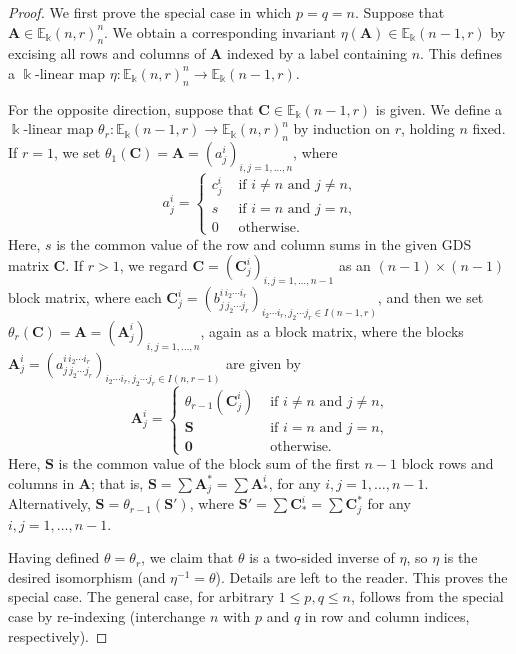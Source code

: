 \documentclass[ALCO,ThmDefs,Unicode,epreuves]{cedram}
\newcommand{\E}{\mathbb{E}}
\newcommand{\bA}{\mathbf{A}}
\newcommand{\bC}{\mathbf{C}}
\newcommand{\bzero}{\mathbf{0}}
\begin{document}
\begin{proof}
We first prove the special case in which $p=q=n$. Suppose that $\bA
\in \E_\Bbbk(n,r)^n_n$. We obtain a corresponding invariant
$\eta(\bA) \in \E_\Bbbk(n-1,r)$ by excising all rows and columns of
$\bA$ indexed by a label containing $n$. This defines a $\Bbbk$-linear
map $\eta: \E_\Bbbk(n,r)^n_n \to \E_\Bbbk(n-1,r)$.

For the opposite direction, suppose that $\bC \in \E_\Bbbk(n-1,r)$ is
given. We define a $\Bbbk$-linear map $\theta_r: \E_\Bbbk(n-1,r) \to
\E_\Bbbk(n,r)^n_n$ by induction on $r$, holding $n$ fixed. If $r=1$,
we set $\theta_1(\bC) = \bA = (a^i_j)_{i,j = 1, \dots, n}$, where
\[
a^i_j = 
\begin{cases}
 c^i_j & \text{ if $i \ne n$ and $j \ne n$,} \\
 s & \text{ if $i = n$ and $j = n$,} \\
 0 & \text{ otherwise.}
\end{cases}
\]
Here, $s$ is the common value of the row and column sums in the given
GDS matrix $\bC$. If $r>1$, we regard $\bC = (\bC^i_j)_{i,j = 1,
 \dots, n-1}$ as an $(n-1) \times (n-1)$ block matrix, where each
$\bC^i_j = (b^{i\, i_2 \cdots i_r}_{j\, j_2 \cdots j_r})_{i_2 \cdots
 i_r, j_2 \cdots j_r \in I(n-1,r)}$, and then we set $\theta_r(\bC) =
\bA = (\bA^i_j)_{i,j = 1, \dots, n}$, again as a block matrix, where
the blocks $\bA^i_j = (a^{i\, i_2 \cdots i_r}_{j\,j_2 \cdots j_r})_{i_2
 \cdots i_r, j_2 \cdots j_r \in I(n,r-1)}$ are given by
\[
\bA^i_j =
\begin{cases}
 \theta_{r-1}(\bC^i_j) & \text{ if $i \ne n$ and $j \ne n$,} \\
 \mathbf{S} & \text{ if $i=n$ and $j=n$,} \\
 \bzero & \text{ otherwise.}
\end{cases}
\]
Here, $\mathbf{S}$ is the common value of the block sum of the first
$n-1$ block rows and columns in $\bA$; that is, $\mathbf{S} = \sum
\bA^*_j = \sum \bA^i_*$, for any $i, j = 1, \dots,
n-1$. Alternatively, $\mathbf{S} = \theta_{r-1}(\mathbf{S}')$, where
$\mathbf{S}' = \sum \bC^i_* = \sum \bC^*_j$ for any $i,j = 1, \dots,
n-1$.

Having defined $\theta = \theta_r$, we claim that $\theta$ is a two-sided
inverse of $\eta$, so $\eta$ is the desired isomorphism (and
$\eta^{-1} = \theta$). Details are left to the reader. This proves
the special case. The general case, for arbitrary $1 \le p,q \le n$,
follows from the special case by re-indexing (interchange $n$ with $p$
and $q$ in row and column indices, respectively). 
\end{proof}
\end{document}
